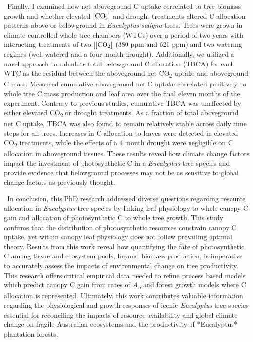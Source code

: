 \documentclass[a4paper]{article}\usepackage[]{graphicx}\usepackage[]{color}
\begin{document}
\
Finally, I examined how net aboveground C uptake correlated to tree biomass growth and whether elevated $[\textrm{CO\textsubscript{2}}]$ and drought treatments altered C allocation patterns above or belowground in \textit{Eucalyptus saligna} trees. Trees were grown in climate-controlled whole tree chambers (WTCs) over a period of two years with interacting treatments of two [$[\textrm{CO\textsubscript{2}}]$ (380 ppm and 620 ppm) and two watering regimes (well-watered and a four-month drought). Additionally, we utilized a novel approach to calculate total belowground C allocation (TBCA) for each WTC as the residual between the aboveground net CO\textsubscript{2} uptake and aboveground C mass. Measured cumulative aboveground net C uptake correlated positively to whole tree C mass production and leaf area over the final eleven months of the experiment. Contrary to previous studies, cumulative TBCA was unaffected by either elevated CO\textsubscript{2} or drought treatments. As a fraction of total aboveground net C uptake, TBCA was also found to remain relatively stable across daily time steps for all trees. Increases in C allocation to leaves were detected in elevated CO\textsubscript{2} treatments, while the effects of a 4 month drought were negligible on C allocation in aboveground tissues.  These results reveal how climate change factors impact the investment of photosynthetic C in a \textit{Eucalyptus} tree species and provide evidence that belowground processes may not be as sensitive to global change factors as previously thought. 

\
In conclusion, this PhD research addressed diverse questions regarding resource allocation in \textit{Eucalyptus} tree species by linking leaf physiology to whole canopy C gain and allocation of photosynthetic C to whole tree growth. This study confirms that the distribution of photosynthetic resources constrain canopy C uptake, yet within canopy leaf physiology does not follow prevailing optimal theory. Results from this work reveal how quantifying the fate of photosynthetic C among tissue and ecosystem pools, beyond biomass production, is imperative to accurately assess the impacts of environmental change on tree productivity. This research offers critical empirical data needed to refine process based models which predict canopy C gain from rates of \textit{A\textsubscript{n}} and forest growth models where C allocation is represented. Ultimately, this work contributes valuable information regarding the physiological and growth responses of iconic \textit{Eucalyptus} tree species essential for reconciling the impacts of resource availability and global climate change on fragile Australian ecosystems and the productivity of *Eucalyptus* plantation forests. 
\end{document}
